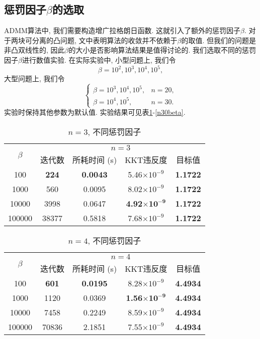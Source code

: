 \subsection{惩罚因子$\beta$的选取}
ADMM算法中, 我们需要构造增广拉格朗日函数. 这就引入了额外的惩罚因子$\beta$. 对于两块可分离的凸问题, 文\cite{Boyd2011Distributed}中表明算法的收敛并不依赖于$\beta$的取值. 但我们的问题是非凸双线性的, 因此$\beta$的大小是否影响算法结果是值得讨论的. 我们选取不同的惩罚因子$\beta$进行数值实验. 在实际实验中, 小型问题上, 我们令
$$\beta=10^2,10^3,10^4,10^5,$$
大型问题上, 我们令
$$\left\{\begin{array}{ll}
\beta=10^3,10^4,10^5, & n=20,\\
\beta=10^4,10^5, & n=30.
\end{array}\right.$$
实验时保持其他参数为默认值. 实验结果可见表\ref{n3beta}-\ref{n30beta}. 
\begin{table}[htbp]
	\renewcommand{\captionfont}{\small}
    \centering
    \caption{$n=3$, 不同惩罚因子}
    \label{n3beta}
    \vskip 4mm
    \begin{tabular}{c|c|c|c|c}
        \hline
        \multirow{2}{*}{$\beta$} & \multicolumn{4}{c}{$n=3$}\\\cline{2-5}
          & 迭代数 & 所耗时间 (s) & KKT违反度 & 目标值\\\hline
        100 & \textbf{224} & \textbf{0.0043} & 5.46$\times10^{-9}$ & \textbf{1.1722}\\\hline
        1000 & 560 & 0.0095 & 8.02$\times10^{-9}$ & \textbf{1.1722}\\\hline
        10000 & 3998 & 0.0647 & \textbf{4.92$\mathbf{\times10^{-9}}$} & \textbf{1.1722}\\\hline
        100000 & 38377 & 0.5818 & 7.68$\times10^{-9}$ & \textbf{1.1722}\\\hline
    \end{tabular}
\end{table}

\begin{table}[htbp]
	\renewcommand{\captionfont}{\small}
    \centering
    \caption{$n=4$, 不同惩罚因子}
    \label{n4beta}
    \vskip 4mm
    \begin{tabular}{c|c|c|c|c}
        \hline
        \multirow{2}{*}{$\beta$} & \multicolumn{4}{c}{$n=4$}\\\cline{2-5}
          & 迭代数 & 所耗时间 (s) & KKT违反度 & 目标值\\\hline
        100 & \textbf{601} & \textbf{0.0195} & 8.28$\times10^{-9}$ & \textbf{4.4934}\\\hline
        1000 & 1120 & 0.0369 & \textbf{1.56$\mathbf{\times10^{-9}}$} & \textbf{4.4934}\\\hline
        10000 & 7458 & 0.2249 & 8.59$\times10^{-9}$ & \textbf{4.4934}\\\hline
        100000 & 70836 & 2.1851 & 7.55$\times10^{-9}$ & \textbf{4.4934}\\\hline
    \end{tabular}
\end{table}

